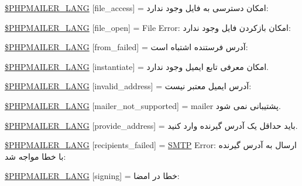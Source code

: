 \begin{DoxyCompactItemize}
\item 
\hyperlink{phpmailer_8lang-fa_8php_a7e83349023b856ef9e5c46e30ae6d51e}{\$\+P\+H\+P\+M\+A\+I\+L\+E\+R\+\_\+\+L\+A\+NG} \mbox{[}\textquotesingle{}file\+\_\+access\textquotesingle{}\mbox{]} = \textquotesingle{}امکان دسترسی به فایل وجود ندارد\+: \textquotesingle{}
\item 
\hyperlink{phpmailer_8lang-fa_8php_a28d1a6517bf4c942a0ddd506188ad2e0}{\$\+P\+H\+P\+M\+A\+I\+L\+E\+R\+\_\+\+L\+A\+NG} \mbox{[}\textquotesingle{}file\+\_\+open\textquotesingle{}\mbox{]} = \textquotesingle{}File Error\+: امکان بازکردن فایل وجود ندارد\+: \textquotesingle{}
\item 
\hyperlink{phpmailer_8lang-fa_8php_adf832ae12155a09be077c6d5e4fd7e22}{\$\+P\+H\+P\+M\+A\+I\+L\+E\+R\+\_\+\+L\+A\+NG} \mbox{[}\textquotesingle{}from\+\_\+failed\textquotesingle{}\mbox{]} = \textquotesingle{}آدرس فرستنده اشتباه است\+: \textquotesingle{}
\item 
\hyperlink{phpmailer_8lang-fa_8php_ad58dde16780f4770ccf4dd282ea1f5ad}{\$\+P\+H\+P\+M\+A\+I\+L\+E\+R\+\_\+\+L\+A\+NG} \mbox{[}\textquotesingle{}instantiate\textquotesingle{}\mbox{]} = \textquotesingle{}امکان معرفی تابع ایمیل وجود ندارد.\textquotesingle{}
\item 
\hyperlink{phpmailer_8lang-fa_8php_a42d61bcea4c79599ecb44fd062f54d47}{\$\+P\+H\+P\+M\+A\+I\+L\+E\+R\+\_\+\+L\+A\+NG} \mbox{[}\textquotesingle{}invalid\+\_\+address\textquotesingle{}\mbox{]} = \textquotesingle{}آدرس ایمیل معتبر نیست\+: \textquotesingle{}
\item 
\hyperlink{phpmailer_8lang-fa_8php_aa2ebcb8833ee83a7ad67401c4bb3a6ad}{\$\+P\+H\+P\+M\+A\+I\+L\+E\+R\+\_\+\+L\+A\+NG} \mbox{[}\textquotesingle{}mailer\+\_\+not\+\_\+supported\textquotesingle{}\mbox{]} = \textquotesingle{} mailer پشتیبانی نمی شود.\textquotesingle{}
\item 
\hyperlink{phpmailer_8lang-fa_8php_a8b97897c2406b7392b056f375feeefbb}{\$\+P\+H\+P\+M\+A\+I\+L\+E\+R\+\_\+\+L\+A\+NG} \mbox{[}\textquotesingle{}provide\+\_\+address\textquotesingle{}\mbox{]} = \textquotesingle{}باید حداقل یک آدرس گیرنده وارد کنید.\textquotesingle{}
\item 
\hyperlink{phpmailer_8lang-fa_8php_a7589d30bb9b368327c2df015f3e6bcba}{\$\+P\+H\+P\+M\+A\+I\+L\+E\+R\+\_\+\+L\+A\+NG} \mbox{[}\textquotesingle{}recipients\+\_\+failed\textquotesingle{}\mbox{]} = \textquotesingle{}\hyperlink{class_s_m_t_p}{S\+M\+TP} Error\+: ارسال به آدرس گیرنده با خطا مواجه شد\+: \textquotesingle{}
\item 
\hyperlink{phpmailer_8lang-fa_8php_a68e437bdb9b968a5a67320f03d231565}{\$\+P\+H\+P\+M\+A\+I\+L\+E\+R\+\_\+\+L\+A\+NG} \mbox{[}\textquotesingle{}signing\textquotesingle{}\mbox{]} = \textquotesingle{}خطا در امضا\+: \textquotesingle{}

\end{DoxyCompactItemize}
